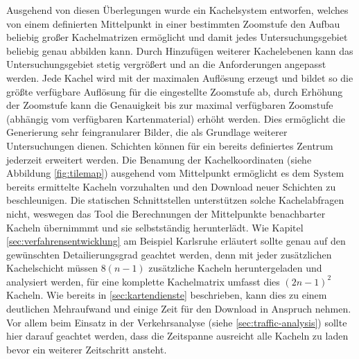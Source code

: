 Ausgehend von diesen Überlegungen wurde ein Kachelsystem entworfen, welches von einem definierten Mittelpunkt in einer bestimmten Zoomstufe den Aufbau beliebig großer Kachelmatrizen ermöglicht und damit jedes Untersuchungsgebiet beliebig genau abbilden kann. Durch Hinzufügen weiterer Kachelebenen kann das Untersuchungsgebiet stetig vergrößert und an die Anforderungen angepasst werden. Jede Kachel wird mit der maximalen Auflösung erzeugt und bildet so die größte verfügbare Auflösung für die eingestellte Zoomstufe ab, durch Erhöhung der Zoomstufe kann die Genauigkeit bis zur maximal verfügbaren Zoomstufe (abhängig vom verfügbaren Kartenmaterial) erhöht werden. Dies ermöglicht die Generierung sehr feingranularer Bilder, die als Grundlage weiterer Untersuchungen dienen. Schichten können für ein bereits definiertes Zentrum jederzeit erweitert werden. Die Benamung der Kachelkoordinaten (siehe Abbildung \ref{fig:tilemap}) ausgehend vom Mittelpunkt ermöglicht es dem System bereits ermittelte Kacheln vorzuhalten und den Download neuer Schichten zu beschleunigen. Die statischen Schnittstellen unterstützen solche Kachelabfragen nicht, weswegen das Tool die Berechnungen der Mittelpunkte benachbarter Kacheln übernimmmt und sie selbstständig herunterlädt. Wie Kapitel \ref{sec:verfahrensentwicklung} am Beispiel Karlsruhe erläutert sollte genau auf den gewünschten Detailierungsgrad geachtet werden, denn mit jeder zusätzlichen Kachelschicht müssen $8(n-1)$ zusätzliche Kacheln heruntergeladen und analysiert werden, für eine komplette Kachelmatrix umfasst dies $(2n-1)^2$ Kacheln. Wie bereits in \ref{sec:kartendienste} beschrieben, kann dies zu einem deutlichen Mehraufwand und einige Zeit für den Download in Anspruch nehmen. Vor allem beim Einsatz in der Verkehrsanalyse (siehe \ref{sec:traffic-analysis}) sollte hier darauf geachtet werden, dass die Zeitspanne ausreicht alle Kacheln zu laden bevor ein weiterer Zeitschritt ansteht.
